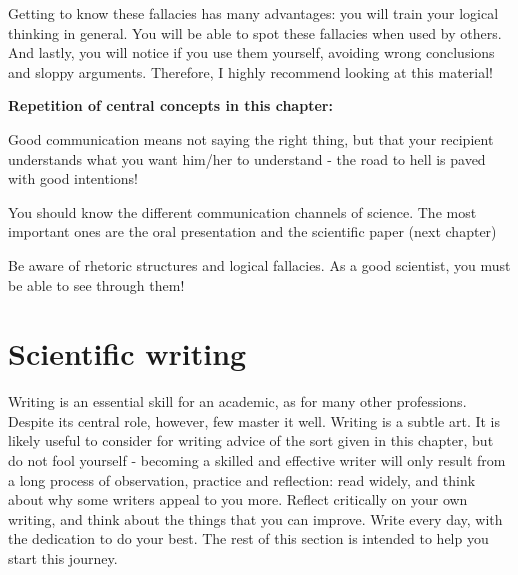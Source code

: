 \documentclass{tufte-book}
\begin{document}
Getting to know these fallacies has many advantages: you will train your logical thinking in general. You will be able to spot these fallacies when used by others. And lastly, you will notice if you use them yourself, avoiding wrong conclusions and sloppy arguments. Therefore, I highly recommend looking at this material!

\vspace{1cm}
\begin{mdframed}
    
\textbf{Repetition of central concepts in this chapter:} 

\begin{itemize*}
  \item Good communication means not saying the right thing, but that your recipient understands what you want him/her to understand - the road to hell is paved with good intentions!
  \item You should know the different communication channels of science. The most important ones are the oral presentation and the scientific paper (next chapter)
  \item Be aware of rhetoric structures and logical fallacies. As a good scientist, you must be able to see through them!
\end{itemize*}

\end{mdframed}



\chapter{Scientific writing}

Writing is an essential skill for an academic, as for many other professions.  Despite its central role, however, few master it well. Writing is a subtle art. It is likely useful to consider for writing advice of the sort given in this chapter, but do not fool yourself - becoming a skilled and effective writer will only result from a long process of observation, practice and reflection: read widely, and think about why some writers appeal to you more. Reflect critically on your own writing, and think about the things that you can improve. Write every day, with the dedication to do your best. The rest of this section is intended to help you start this journey. 
\end{document}
